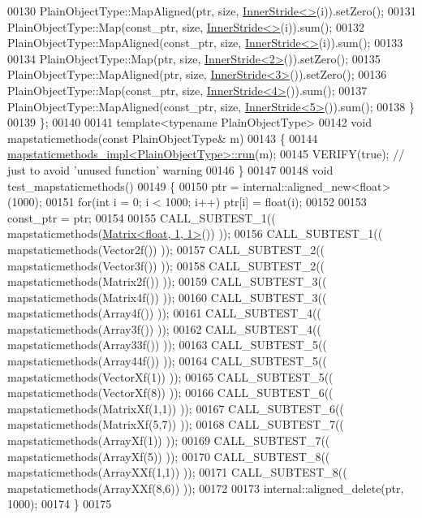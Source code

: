 \begin{DoxyCode}
00130     PlainObjectType::MapAligned(ptr, size, \hyperlink{class_eigen_1_1_inner_stride}{InnerStride<>}(i)).setZero();
00131     PlainObjectType::Map(const\_ptr, size, \hyperlink{class_eigen_1_1_inner_stride}{InnerStride<>}(i)).sum();
00132     PlainObjectType::MapAligned(const\_ptr, size, \hyperlink{class_eigen_1_1_inner_stride}{InnerStride<>}(i)).sum();
00133 
00134     PlainObjectType::Map(ptr, size, \hyperlink{class_eigen_1_1_inner_stride}{InnerStride<2>}()).setZero();
00135     PlainObjectType::MapAligned(ptr, size, \hyperlink{class_eigen_1_1_inner_stride}{InnerStride<3>}()).setZero();
00136     PlainObjectType::Map(const\_ptr, size, \hyperlink{class_eigen_1_1_inner_stride}{InnerStride<4>}()).sum();
00137     PlainObjectType::MapAligned(const\_ptr, size, \hyperlink{class_eigen_1_1_inner_stride}{InnerStride<5>}()).sum();
00138   \}
00139 \};
00140 
00141 \textcolor{keyword}{template}<\textcolor{keyword}{typename} PlainObjectType>
00142 \textcolor{keywordtype}{void} mapstaticmethods(\textcolor{keyword}{const} PlainObjectType& m)
00143 \{
00144   \hyperlink{structmapstaticmethods__impl}{mapstaticmethods\_impl<PlainObjectType>::run}(m);
00145   VERIFY(\textcolor{keyword}{true}); \textcolor{comment}{// just to avoid 'unused function' warning}
00146 \}
00147 
00148 \textcolor{keywordtype}{void} test\_mapstaticmethods()
00149 \{
00150   ptr = internal::aligned\_new<float>(1000);
00151   \textcolor{keywordflow}{for}(\textcolor{keywordtype}{int} i = 0; i < 1000; i++) ptr[i] = \textcolor{keywordtype}{float}(i);
00152 
00153   const\_ptr = ptr;
00154 
00155   CALL\_SUBTEST\_1(( mapstaticmethods(\hyperlink{group___core___module_class_eigen_1_1_matrix}{Matrix<float, 1, 1>}()) ));
00156   CALL\_SUBTEST\_1(( mapstaticmethods(Vector2f()) ));
00157   CALL\_SUBTEST\_2(( mapstaticmethods(Vector3f()) ));
00158   CALL\_SUBTEST\_2(( mapstaticmethods(Matrix2f()) ));
00159   CALL\_SUBTEST\_3(( mapstaticmethods(Matrix4f()) ));
00160   CALL\_SUBTEST\_3(( mapstaticmethods(Array4f()) ));
00161   CALL\_SUBTEST\_4(( mapstaticmethods(Array3f()) ));
00162   CALL\_SUBTEST\_4(( mapstaticmethods(Array33f()) ));
00163   CALL\_SUBTEST\_5(( mapstaticmethods(Array44f()) ));
00164   CALL\_SUBTEST\_5(( mapstaticmethods(VectorXf(1)) ));
00165   CALL\_SUBTEST\_5(( mapstaticmethods(VectorXf(8)) ));
00166   CALL\_SUBTEST\_6(( mapstaticmethods(MatrixXf(1,1)) ));
00167   CALL\_SUBTEST\_6(( mapstaticmethods(MatrixXf(5,7)) ));
00168   CALL\_SUBTEST\_7(( mapstaticmethods(ArrayXf(1)) ));
00169   CALL\_SUBTEST\_7(( mapstaticmethods(ArrayXf(5)) ));
00170   CALL\_SUBTEST\_8(( mapstaticmethods(ArrayXXf(1,1)) ));
00171   CALL\_SUBTEST\_8(( mapstaticmethods(ArrayXXf(8,6)) ));
00172 
00173   internal::aligned\_delete(ptr, 1000);
00174 \}
00175 
\end{DoxyCode}
